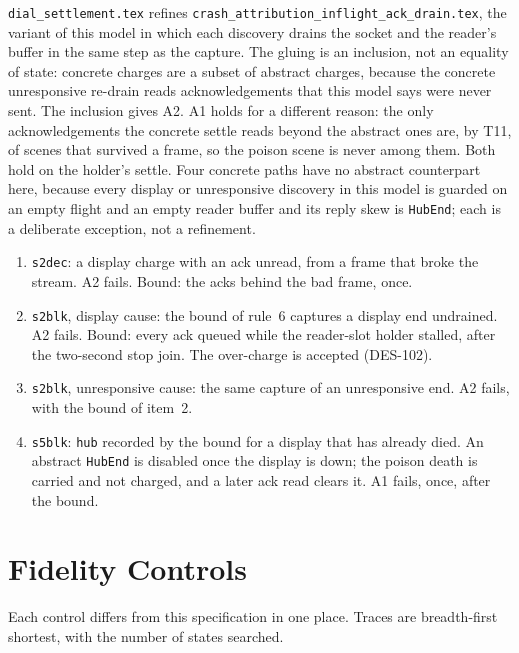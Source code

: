\documentclass[a4paper,10pt,fleqn]{article}
\begin{document}
\texttt{dial\_settlement.tex} refines
\texttt{crash\_attribution\_inflight\_ack\_drain.tex}, the variant of this model
in which each discovery drains the socket and the reader's buffer in the same
step as the capture.  The gluing is an inclusion, not an equality of state:
concrete charges are a subset of abstract charges, because the concrete
unresponsive re-drain reads acknowledgements that this model says were never
sent.  The inclusion gives A2.  A1 holds for a different reason: the only
acknowledgements the concrete settle reads beyond the abstract ones are, by T11,
of scenes that survived a frame, so the poison scene is never among them.  Both
hold on the holder's settle.  Four concrete paths
have no abstract counterpart here, because every display or unresponsive
discovery in this model is guarded on an empty flight and an empty reader buffer
and its reply skew is \texttt{HubEnd}; each is a deliberate exception, not a
refinement.
\begin{enumerate}
  \item \texttt{s2dec}: a display charge with an ack unread, from a frame that
    broke the stream.  A2 fails.  Bound: the acks behind the bad frame, once.
  \item \texttt{s2blk}, display cause: the bound of rule~6 captures a display
    end undrained.  A2 fails.  Bound: every ack queued while the reader-slot
    holder stalled, after the two-second stop join.  The over-charge is accepted
    (DES-102).
  \item \texttt{s2blk}, unresponsive cause: the same capture of an unresponsive
    end.  A2 fails, with the bound of item~2.
  \item \texttt{s5blk}: \texttt{hub} recorded by the bound for a display that
    has already died.  An abstract \texttt{HubEnd} is disabled once the display is
    down; the poison death is carried and not charged, and a later ack read
    clears it.  A1 fails, once, after the bound.
\end{enumerate}

\section{Fidelity Controls}
\label{sec:fidelity}

Each control differs from this specification in one place.  Traces are
breadth-first shortest, with the number of states searched.
\end{document}
